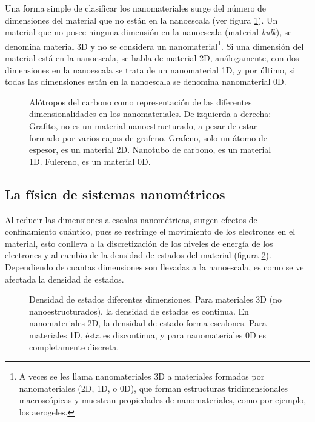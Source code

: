 Una forma simple de clasificar los nanomateriales surge del número de dimensiones del material que no están en la nanoescala (ver figura \ref{fig:carbon_allotropes}). Un material que no posee ninguna dimensión en la nanoescala (material \emph{bulk}), se denomina material 3D y no  se considera un nanomaterial\footnote{A veces se les llama nanomateriales 3D a materiales formados por nanomateriales (2D, 1D, o 0D), que forman estructuras tridimensionales macroscópicas y muestran propiedades de nanomateriales, como por ejemplo, los aerogeles.}. Si una dimensión del material está en la nanoescala, se habla de material 2D, análogamente, con dos dimensiones en la nanoescala se trata de un nanomaterial 1D, y por último, si todas las dimensiones están en la nanoescala se denomina nanomaterial 0D.
\begin{figure}
	\centering
	\caption[Alótropos del carbono mostrando las diferentes dimensionalidades de los nanomateriales]{Alótropos del carbono como representación de las diferentes dimensionalidades en los nanomateriales. De izquierda a derecha: Grafito, no es un material nanoestructurado, a pesar de estar formado por varios capas de grafeno. Grafeno, solo un átomo de espesor, es un material 2D. Nanotubo de carbono, es un material 1D. Fulereno, es un material 0D.}
	\label{fig:carbon_allotropes}
\end{figure}

\subsection{La física de sistemas nanométricos}


Al reducir las dimensiones a escalas nanométricas, surgen efectos de confinamiento cuántico, pues se restringe el movimiento de los electrones en el material, esto conlleva a la discretización de los niveles de energía de los electrones y al cambio de la densidad de estados del material (figura \ref{fig:DoE}). Dependiendo de cuantas dimensiones son llevadas a la nanoescala, es como se ve afectada la densidad de estados.

\begin{figure}[h!]
	\centering
	\caption[Densidad de estados en diferentes dimensionalidades]{Densidad de estados diferentes dimensiones. Para materiales 3D (no nanoestructurados), la densidad de estados es continua. En nanomateriales 2D, la densidad de estado forma escalones. Para materiales 1D, ésta es discontinua, y para nanomateriales 0D es completamente discreta. }
	\label{fig:DoE}
\end{figure}

